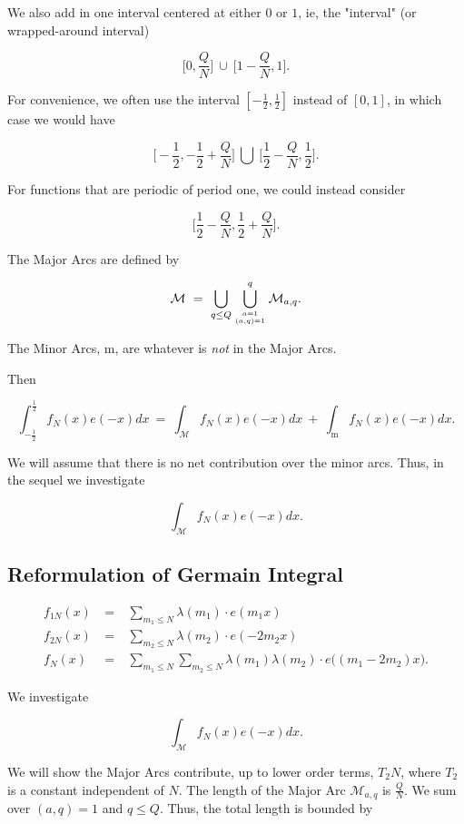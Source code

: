 \documentclass[12pt,letterpaper]{report}
\newcommand\be{\begin{equation}}
\newcommand\ee{\end{equation}}
\newcommand\bea{\begin{eqnarray}}
\newcommand\eea{\end{eqnarray}}
\newcommand{\foh}{\frac{1}{2}}  %
\newcommand{\gl}{\lambda}
\begin{document}
We also add in one interval centered at either $0$ or $1$, ie, the
"interval" (or wrapped-around interval)

\be \Bigg[0, \frac{Q}{N}\Bigg] \ \cup \ \Bigg[1 - \frac{Q}{N}, 1
\Bigg]. \ee

For convenience, we often use the interval $[-\foh,\foh]$ instead
of $[0,1]$, in which case we would have

\be \Bigg[ -\foh, -\foh + \frac{Q}{N} \Bigg] \ \bigcup \ \Bigg[
\foh - \frac{Q}{N}, \foh \Bigg]. \ee

For functions that are periodic of period one, we could instead
consider

\be \Bigg[ \foh - \frac{Q}{N}, \foh + \frac{Q}{N} \Bigg]. \ee

The Major Arcs are defined by

\be \mathcal{M} \ = \ \bigcup_{q \le Q} \bigcup_{a = 1 \atop (a,q)
= 1}^{q} \mathcal{M}_{a,q}. \ee

The Minor Arcs, $\mathrm{m}$, are whatever is \emph{not} in the
Major Arcs.

Then

\be \int_{-\foh}^{\foh}f_N(x)e(-x)dx \ = \
\int_{\mathcal{M}}f_N(x)e(-x)dx \ + \ \int_{\mathrm{m}}
f_N(x)e(-x)dx. \ee

We will assume that there is no net contribution over the minor
arcs. Thus, in the sequel we investigate

\be \int_{\mathcal{M}} f_N(x)e(-x)dx. \ee


\subsection{Reformulation of Germain Integral}

\bea f_{1N}(x) & \ = \ & \sum_{m_1 \le N} \gl(m_1) \cdot e(m_1x) \nonumber\\
f_{2N}(x) & \ = \ & \sum_{m_2 \le N} \gl(m_2) \cdot e(-2m_2 x)
\nonumber\\ f_N(x) & \ = \ & \sum_{m_1 \le N} \sum_{m_2 \le N}
\gl(m_1) \gl(m_2) \cdot e\Big( (m_1 - 2m_2)x \Big). \eea

We investigate

\be \int_{\mathcal{M}} f_N(x) e(-x)dx. \ee

We will show the Major Arcs contribute, up to lower order terms,
$T_2 N$, where $T_2$ is a constant independent of $N$. The length
of the Major Arc $\mathcal{M}_{a,q}$ is $\frac{Q}{N}$. We sum over
$(a,q) = 1$ and $q \le Q$. Thus, the total length is bounded by
\end{document}
